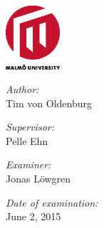 \begin{titlepage}


\begin{center}

\AddToShipoutPicture*{\BackgroundPic}

\includegraphics[width=0.15\textwidth]{mah2.eps}~\\[1cm]

\vspace*{1.5cm}

\begin{minipage}{0.43\textwidth}
\begin{flushleft} \large
\emph{Author:}\\
Tim von Oldenburg
\end{flushleft}
\end{minipage}
\begin{minipage}{0.43\textwidth}
\begin{flushright} \large
\emph{Supervisor:} \\
Pelle Ehn
\end{flushright}
\end{minipage}

\vspace*{0.4cm}

\begin{minipage}{0.86\textwidth}
\begin{flushright} \large
\emph{Examiner:} \\
Jonas Löwgren\\
\end{flushright}
\end{minipage}

\vspace*{0.4cm}

\begin{minipage}{0.86\textwidth}
\begin{flushright} \large
\emph{Date of examination:}\\
June 2, 2015
\end{flushright}
\end{minipage}
\vspace*{3.5cm}


\end{center}
\end{titlepage}
